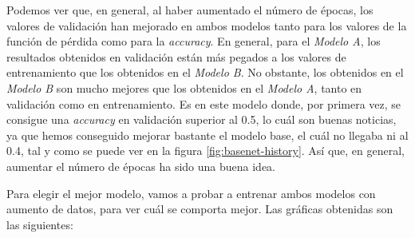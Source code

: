 \documentclass[11pt,a4paper]{article}
\begin{document}
Podemos ver que, en general, al haber aumentado el número de épocas, los valores de validación han mejorado en ambos modelos tanto para los valores
de la función de pérdida como para la \textit{accuracy}. En general, para el \textit{Modelo A}, los resultados obtenidos en validación
están más pegados a los valores de entrenamiento que los obtenidos en el \textit{Modelo B}. No obstante, los obtenidos en el \textit{Modelo B}
son mucho mejores que los obtenidos en el \textit{Modelo A}, tanto en validación como en entrenamiento. Es en este modelo donde, por primera vez,
se consigue una \textit{accuracy} en validación superior al 0.5, lo cuál son buenas noticias, ya que hemos conseguido mejorar bastante el modelo
base, el cuál no llegaba ni al 0.4, tal y como se puede ver en la figura \ref{fig:basenet-history}. Así que, en general, aumentar el número
de épocas ha sido una buena idea.

Para elegir el mejor modelo, vamos a probar a entrenar ambos modelos con aumento de datos, para ver cuál se comporta mejor. Las gráficas
obtenidas son las siguientes:
\end{document}

